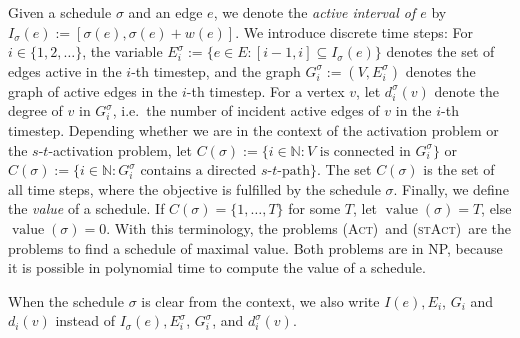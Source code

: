 \documentclass[runningheads]{llncs}
\numberwithin{equation}{section}
\newcommand{\N}{\mathbb{N}}
\newcommand{\set}[1]{\{ #1 \}}
\newcommand{\fromto}[2]{\set{#1, \ldots, #2}}
\newcommand{\act}{\textsc{(Act)}}
\newcommand{\stact}{\textsc{(stAct)}}
\DeclareMathOperator{\val}{\text{value}}
\begin{document}
Given a schedule $\sigma$ and an edge $e$, we denote the \emph{active interval of $e$} by $I_\sigma(e) := [\sigma(e), \sigma(e) + w(e)]$. We introduce discrete time steps: For $i \in \{1, 2, \dots\}$, the variable $E^\sigma_i := \set{e \in E : [i-1, i] \subseteq I_\sigma(e)}$ denotes the set of edges active in the $i$-th timestep, and the graph $G^\sigma_i := (V, E^\sigma_i)$ denotes the graph of active edges in the $i$-th timestep. For a vertex $v$, let $d^\sigma_i(v)$ denote the degree of $v$ in $G^\sigma_i$, i.e.\ the number of incident active edges of $v$ in the $i$-th timestep.
Depending whether we are in the context of the activation problem or the $s$-$t$-activation problem, let $C(\sigma) := \set{i \in \N : V \text{ is connected in } G^\sigma_i}$ or  $C(\sigma) := \set{i \in \N : G_i^\sigma \text{ contains a directed $s$-$t$-path}}$. The set $C(\sigma)$ is the set of all time steps, where the objective is fulfilled by the schedule $\sigma$. Finally, we define the \emph{value} of a schedule. If $C(\sigma) = \fromto{1}{T}$ for some $T$, let $\val(\sigma) = T$, else $\val(\sigma) = 0$.
With this terminology, the problems \act\ and \stact\ are the problems to find a schedule of maximal value. Both problems are in NP, because it is possible in polynomial time to compute the value of a schedule. 

When the schedule $\sigma$ is clear from the context, we also write $I(e), E_i$, $G_i$ and $d_i(v)$ instead of $I_\sigma(e), E^\sigma_i$, $G^\sigma_i$, and $d^\sigma_i(v)$. 
\end{document}
